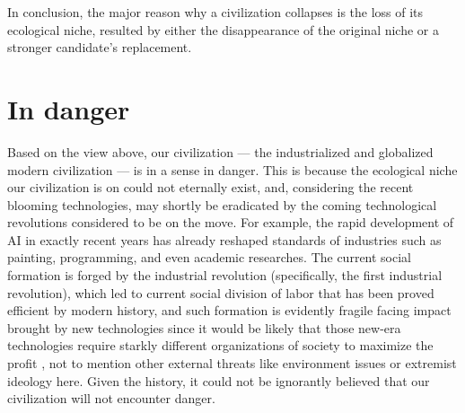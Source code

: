 \documentclass[a4paper,12pt]{article}
\begin{document}
    In conclusion, the major reason why a civilization collapses is the loss of its ecological niche, resulted by either the disappearance of the original niche or a stronger candidate's replacement.
    
    \section{In danger}
    Based on the view above, our civilization --- the industrialized and globalized modern civilization --- is in a sense in danger.
    This is because the ecological niche our civilization is on could not eternally exist, and, considering the recent blooming technologies, may shortly be eradicated by the coming technological revolutions considered to be on the move.
    For example, the rapid development of AI in exactly recent years has already reshaped standards of industries such as painting, programming, and even academic researches.
    The current social formation is forged by the industrial revolution (specifically, the first industrial revolution), which led to current social division of labor that has been proved efficient by modern history, and such formation is evidently fragile facing impact brought by new technologies since it would be likely that those new-era technologies require starkly different organizations of society to maximize the profit \cite{2019_ImpactAIOnLabor}, not to mention other external threats like environment issues or extremist ideology here.
    Given the history, it could not be ignorantly believed that our civilization will not encounter danger.
    
\end{document}
